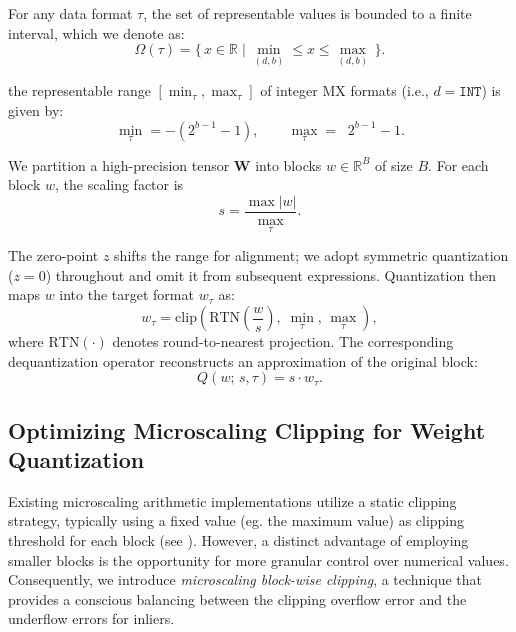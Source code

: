 For any data format $\tau$, the set of representable values is bounded to a finite interval, which we denote as:
\begin{equation}
\Omega(\tau) = \{\, x \in \mathbb{R} \mid
\min_{(d,b)} \le x \le \max_{(d,b)} \,\}.
\end{equation}

 the representable range $[\min_{\tau}, \max_{\tau}]$ of integer MX formats (i.e., $d = \texttt{INT}$) is given by:
\begin{equation}
\min_{\tau} = -(2^{b-1}-1),
\qquad
\max_{\tau} = \;\;2^{b-1}-1.
\end{equation}

We partition a high-precision tensor $\mathbf{W}$ into blocks $w \in \mathbb{R}^B$ of size $B$. For each block $w$, the scaling factor is
\begin{equation}
s = \frac{\max |w|}{\max_{\tau}}.
\label{eq:scaling_calculating}
\end{equation}

The zero-point $z$ shifts the range for alignment; we adopt symmetric quantization ($z=0$) throughout and omit it from subsequent expressions. Quantization then maps $w$ into the target format $w_{\tau}$ as:
\begin{equation}
\label{equ:clip}
w_{\tau}
=
\mathrm{clip}\!\left(
\mathrm{RTN}\!\left(\frac{w}{s}\right),\;
\min_{\tau},\, \max_{\tau}
\right),
\end{equation}
where $\mathrm{RTN}(\cdot)$ denotes round-to-nearest projection. The corresponding dequantization operator reconstructs an approximation of the original block:
\begin{equation}
Q\!\left(w;\, s, \tau\right) = s \cdot w_{\tau}.
\end{equation}


\subsection{Optimizing Microscaling Clipping for Weight Quantization}
\label{sec:quantization:gptq}

Existing microscaling arithmetic implementations utilize a static clipping strategy, typically using a fixed value (eg. the maximum value) as clipping threshold for each block (see ). However, a distinct advantage of employing smaller blocks is the opportunity for more granular control over numerical values. Consequently, we introduce \emph{microscaling block-wise clipping}, a technique that provides a conscious balancing between the clipping overflow error and the underflow errors for inliers.

